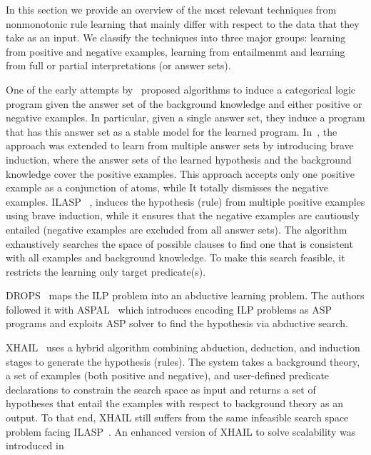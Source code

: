 In this section we provide an overview of the most relevant techniques from nonmonotonic rule learning that mainly differ with respect to the data that they take as an input.
We classify the techniques into three major groups: learning from positive and negative examples, learning from entailmenmt and learning from full or partial interpretations (or answer sets).


 One of the early attempts by~\cite{DBLP:journals/tocl/Sakama05} proposed algorithms to induce a categorical logic program given the answer set of the background knowledge and either positive or negative examples. In particular, given a single answer set, they induce a program that has this answer set as a stable model for the learned program. In~\cite{Sakama2009}, the approach was extended to learn from multiple answer sets by introducing brave induction, where the answer sets of the learned hypothesis and the background knowledge cover the positive examples. This approach accepts only one positive example as a conjunction of atoms, while It totally dismisses the negative examples. ILASP ~\cite{ILASP_system}, induces the hypothesis (\ie rule) from multiple positive examples using brave induction, while it ensures that the negative examples are cautiously entailed (\ie negative examples are excluded from all answer sets). The algorithm exhaustively searches the space of possible clauses to find one that is consistent with all examples and background knowledge. To make this search feasible, it restricts the learning only target predicate(s). 


 DROPS~\cite{CorapiRL10} maps the ILP problem into an abductive learning problem. The authors followed it with ASPAL~\cite{ASPAL} which introduces encoding ILP problems as ASP programs and exploits ASP solver to find the hypothesis via abductive search. 

XHAIL~\cite{XHAIL} uses a hybrid algorithm combining abduction, deduction, and induction stages to generate the hypothesis (\ie rules). The system takes a background theory, a set of examples (both positive and negative), and user-defined predicate declarations to constrain the search space as input and returns a set of hypotheses that entail the examples with respect to background theory as an output. To that end, XHAIL still suffers from the same infeasible search space problem facing ILASP~\cite{Sakama2009}. An enhanced version of XHAIL to solve scalability was introduced in~\cite{XHAIL_extended} 

